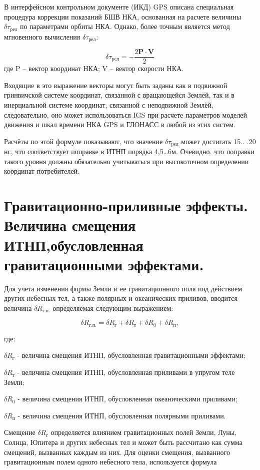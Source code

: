 \documentclass[14pt,a4paper,oneside]{extarticle}
\begin{document}
В интерфейсном контрольном документе (ИКД) GPS описана специальная процедура коррекции показаний БШВ НКА, основанная на расчете величины $\delta \tau_\text{рел}$ по параметрами орбиты НКА. Однако, более точным является метод мгновенного вычисления $\delta \tau_\text{рел}$:

\[\delta\tau_{\text{pe}\text{л}} = - \frac { 2 \boldsymbol{P}\cdot\boldsymbol{V}}{2}\] где P – вектор координат НКА; V – вектор скорости НКА.

Входящие в это выражение векторы могут быть заданы как в подвижной гринвичской системе координат, связанной с вращающейся Землёй, так и в инерциальной системе координат, связанной с неподвижной Землёй, следовательно, оно может использоваться IGS при расчете параметров моделей движения и шкал времени НКА GPS и ГЛОНАСС в любой из этих систем.

Расчёты по этой формуле показывают, что значение $\delta\tau_{\text{pe}\text{л}}$ может достигать 15.. .20 нс, что соответствует поправке в ИТНП порядка 4,5…6м. Очевидно, что поправки такого уровня должны обязательно учитываться при высокоточном определении координат потребителей.

\section{Гравитационно-приливные эффекты. Величина смещения ИТНП,обусловленная гравитационными эффектами.}

Для учета изменения формы Земли и ее гравитационного поля под действием других небесных тел, а также полярных и океанических приливов, вводится величина $\delta R_\text{г.п.}$ определяемая следующим выражением:

\[\delta R_\text{г.п.}=\delta R_\text{г}+\delta R_\text{т}+\delta R_\text{0}+\delta R_\text{п},\]

где:

$\delta R_\text{г}$ - величина смещения ИТНП, обусловленная гравитационными эффектами;

$\delta R_\text{т}$ - величина смещения ИТНП, обусловленная приливами в упругом теле Земли;

$\delta R_\text{0}$ - величина смещения ИТНП, обусловленная океаническими приливами;

$\delta R_\text{п}$ - величина смещения ИТНП, обусловленная полярными приливами.

Смещение $\delta R_\text{г}$ определяется влиянием гравитационных полей Земли, Луны, Солнца, Юпитера и других небесных тел и может быть рассчитано как сумма смещений, вызванных каждым из них. Для оценки смещения, вызванного гравитационным полем одного небесного тела, используется формула
\end{document}
